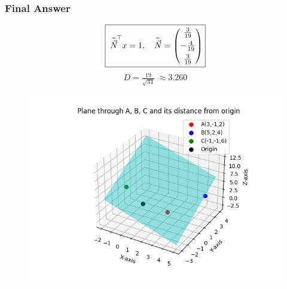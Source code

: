 \documentclass{beamer}
\begin{document}
\begin{frame}
\frametitle{Final Answer}
\begin{equation}
\boxed{\;\widetilde{\Vec{N}}^{\!\top}x = 1,\quad
\widetilde{\Vec{N}} = \begin{pmatrix}\tfrac{3}{19}\\[4pt]-\tfrac{4}{19}\\[4pt]\tfrac{3}{19}\end{pmatrix}}
\end{equation}
\begin{equation}
\boxed{\;D = \tfrac{19}{\sqrt{34}} \;\approx 3.260\;}
\end{equation}
\end{frame}
\begin{frame}
\begin{figure}[h!]
    \centering
    \includegraphics[width=0.65\linewidth]{figs/fig.png}
    \caption{}
\end{figure}
\end{frame}
\end{document}
